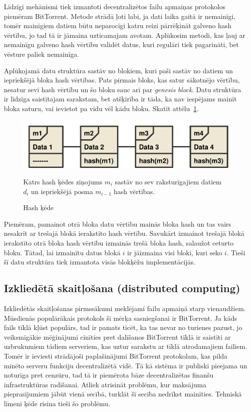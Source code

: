Līdzīgi mehānismi tiek izmantoti decentralizētos failu apmaiņas protokolos piemēram BitTorrent. Metode strādā ļoti labi, ja dati laika gaitā ir nemainīgi, tomēr mainīgiem datiem būtu neparocīgi katru reizi pārrēķināt galveno hash vērtību, jo tad tā ir jāmaina uzticamajam avotam. Aplūkosim metodi, kas ļauj ar nemainīgu galveno hash vērtību validēt datus, kuri regulāri tiek pagarināti, bet vēsture paliek nemainīga.

Aplūkojamā datu struktūra sastāv no blokiem, kuri paši sastāv no datiem un iepriekšējā bloka hash vērtības.\cite{nakamoto08} Pats pirmais bloks, kas satur sākotnējo vērtību, nesatur sevī hash vērtību un šo bloku sauc arī par \textit{genesis block}. Datu struktūra ir līdzīga saistītajam sarakstam, bet atšķirība ir tāda, ka nav iespējams mainīt bloka saturu, vai ievietot pa vidu vēl kādu bloku. Skatīt attēlu~\ref{fig:hash-chain}.

\begin{figure}[htpb]
    \centering
    \includegraphics[scale=0.5]{teorija/hash-chain.pdf}
    \caption{Hash ķēde}
    Katrs hash ķēdes ziņojums $m_i$ sastāv no sev raksturīgajiem datiem $d_i$ un
    iepriekšējā posma $m_{i-1}$ hash vērtības.
\label{fig:hash-chain}
\end{figure}

Piemēram, pamainot otrā bloka datu vērtību mainās bloka hash un tas vairs nesakrīt ar trešajā blokā ierakstīto hash vērtību. Savukārt izmainot trešajā blokā ierakstīto otrā bloka hash vērtību izmainās trešā bloka hash, salaužot ceturto bloku. Tātad, lai izmainītu datus blokā $i$ ir jāizmaina visi bloki, kuri seko $i$. Tieši šī datu struktūra tiek izmantota visās blokķēžu implementācijās.

\subsection{Izkliedētā skaitļošana (distributed computing)}
Izkliedētās skaitļošanas pirmssākumi meklējami failu apmaiņā starp vienaudžiem. Mūsdienās populārākais protokols šī mērķa sasniegšanai ir BitTorrent. Ja kāds fails tīklā kļūst populārs, tad ir pamats ticēt, ka tas nevar no turienes pazust, jo veiksmīgākie mēģinājumi cīnīties pret dalīšanos BitTorrent tīklā ir saistīti ar uzbrukumiem tādiem serveriem, kas uztur sarakstu ar tīklā atrodamajiem failiem. Tomēr ir ieviesti strādājoši paplašinājumi BitTorrent protokolam, kas pilda minēto serveru funkciju decentralizētā vidē.\cite{pouwelse08} Tā kā sistēma ir publiski pieejama un noturīga pret cenzūru, tad tā ir piemērota bāze decentralizētas finanšu infrastruktūras radīšanai. Atliek atrisināt problēmu, kur maksājuma pieprasījumiem jābūt vienā secībā, turklāt šī secība nedrīkst mainīties. Tehniskā līmenī ķēde risina tieši šo problēmu.

